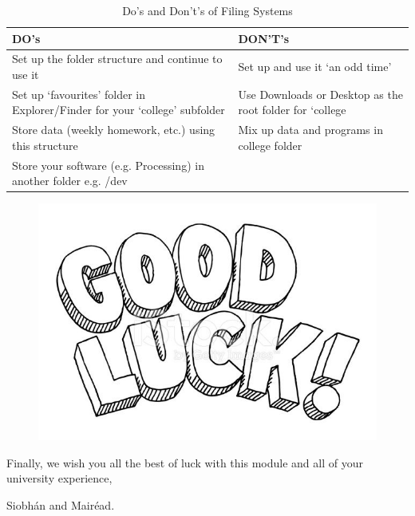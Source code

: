 \documentclass{article}
\begin{document}
\begin{table}[h]
\begin{center}
    \begin{tabular}{ | m{15em}   |m{15em}  }    
        \hline
    \rowcolor{shade3}
    \cellcolor{shade1}DO's & DON'T's   \\ 
     \hline  
     \rowcolor{shade4}
     \cellcolor{shade2} Set up the folder structure and continue to use it 
     & Set up and use it ‘an odd time’
     \\  
     \rowcolor{shade4}
     \hline
     \cellcolor{shade2}Set up ‘favourites’ folder in Explorer/Finder for your ‘college’ subfolder
 & Use Downloads or Desktop as the root folder for ‘college  \\ 
 \hline
     \rowcolor{shade4}
     \cellcolor{shade2}Store data (weekly homework, etc.) using this structure
     &Mix up data and programs in college folder
     \\ 
     \hline
     \rowcolor{shade4}
     \cellcolor{shade2}Store your software (e.g. Processing) in another folder e.g. /dev
 &   \\ 
     \hline
 
  
    \end{tabular}
    \caption{Do's and Don't's of Filing Systems}
    \label{tab:dos-donts}
\end{center}
\end{table}

\vspace{2cm}
\begin{figure}[h]
    \centering
    \includegraphics[width=.8\textwidth]{img/good-luck.jpeg}

    \end{figure}

Finally, we wish you all the best of luck with this module and all of your university experience,
\vspace{1cm}

Siobh\'an and Mair\'ead.
\end{document}
